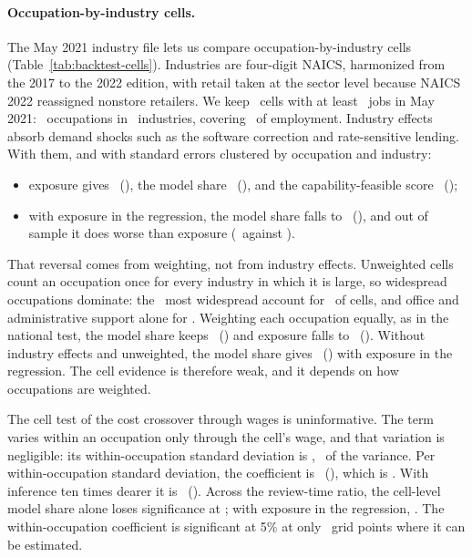 \paragraph{Occupation-by-industry cells.} The May 2021 industry file lets us compare occupation-by-industry cells (Table~\ref{tab:backtest-cells}). Industries are four-digit NAICS, harmonized from the 2017 to the 2022 edition, with retail taken at the sector level because NAICS 2022 reassigned nonstore retailers. We keep \btCellN\ cells with at least \btCellMin\ jobs in May 2021: \btCellOcc\ occupations in \btCellInd\ industries, covering \btCellShare\ of employment. Industry effects absorb demand shocks such as the software correction and rate-sensitive lending. With them, and with standard errors clustered by occupation and industry:
\begin{itemize}
\item exposure gives \btCEB\ (\btCESe), the model share \btCMB\ (\btCMSe), and the capability-feasible score \btCFB\ (\btCFSe);
\item with exposure in the regression, the model share falls to \btCJMB\ (\btCJMSe), and out of sample it does worse than exposure (\btCCvM\ against \btCCvE).
\end{itemize}
That reversal comes from weighting, not from industry effects. Unweighted cells count an occupation once for every industry in which it is large, so widespread occupations dominate: the \btCTopN\ most widespread account for \btCTopShare\ of cells, and office and administrative support alone for \btCTopGroupShare. Weighting each occupation equally, as in the national test, the model share keeps \btCEqJMB\ (\btCEqJMSe) and exposure falls to \btCEqJEB\ (\btCEqJESe). Without industry effects and unweighted, the model share gives \btCNiJMB\ (\btCNiJMSe) with exposure in the regression. The cell evidence is therefore weak, and it depends on how occupations are weighted.

The cell test of the cost crossover through wages is uninformative. The term varies within an occupation only through the cell's wage, and that variation is negligible: its within-occupation standard deviation is \btCWsd, \btCWvar\ of the variance. Per within-occupation standard deviation, the coefficient is \btCWB\ (\btCWSe), which is \btCWSign. With inference ten times dearer it is \btCWpB\ (\btCWpSe). Across the review-time ratio, the cell-level model share alone loses significance at \btCRhoStarAlone; with exposure in the regression, \btCJointPhrase. The within-occupation coefficient is significant at 5\% at only \btCWithinSig\ grid points where it can be estimated.

